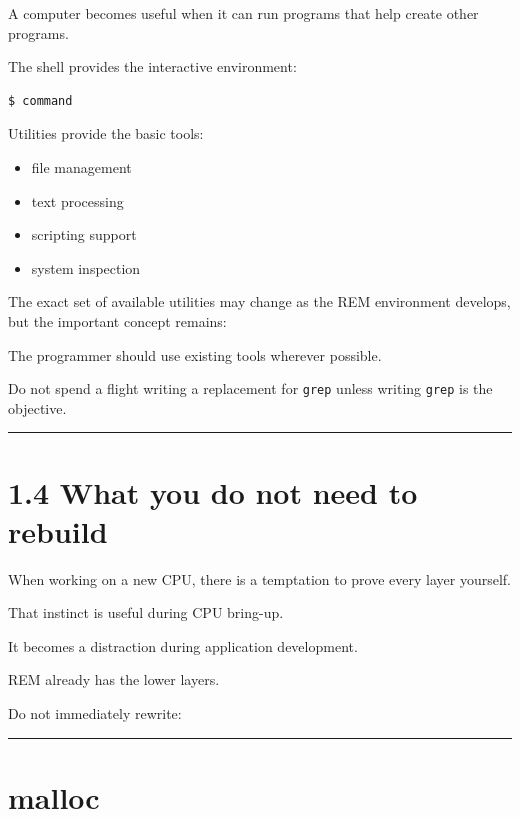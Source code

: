 \documentclass[
  oneside,
  openany]{book}
\providecommand{\tightlist}{%
  \setlength{\itemsep}{0pt}\setlength{\parskip}{0pt}}
\begin{document}
A computer becomes useful when it can run programs that help create
other programs.

The shell provides the interactive environment:

\begin{verbatim}
$ command
\end{verbatim}

Utilities provide the basic tools:

\begin{itemize}
\tightlist
\item
  file management
\item
  text processing
\item
  scripting support
\item
  system inspection
\end{itemize}

The exact set of available utilities may change as the REM environment
develops, but the important concept remains:

The programmer should use existing tools wherever possible.

Do not spend a flight writing a replacement for \texttt{grep} unless
writing \texttt{grep} is the objective.

\begin{center}\rule{0.5\linewidth}{0.5pt}\end{center}

\hypertarget{what-you-do-not-need-to-rebuild}{%
\section{1.4 What you do not need to
rebuild}\label{what-you-do-not-need-to-rebuild}}

When working on a new CPU, there is a temptation to prove every layer
yourself.

That instinct is useful during CPU bring-up.

It becomes a distraction during application development.

REM already has the lower layers.

Do not immediately rewrite:

\begin{center}\rule{0.5\linewidth}{0.5pt}\end{center}

\hypertarget{malloc}{%
\section{malloc}\label{malloc}}
\end{document}
